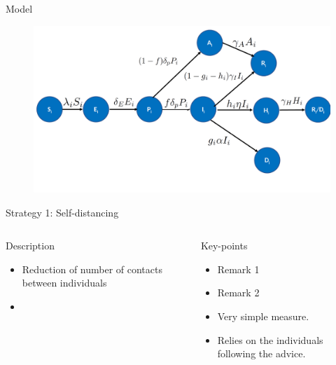 \documentclass[12pt,handout]{beamer}
\begin{document}
\begin{frame}{Model}
    \begin{figure}[ht]
        \includegraphics[width=.95\linewidth]{Model_graph_APG}
    \end{figure}
\end{frame}

\begin{frame}{Strategy 1: Self-distancing}

    \begin{columns}[t]
        \begin{column}{.5\textwidth}
        \begin{block}{Description}
        \begin{itemize}
            \item Reduction of number of contacts between individuals
            \item 
        \end{itemize}
        \end{block}
        \end{column}
        \begin{column}{.5\textwidth}
            \begin{block}{Key-points}
            \begin{itemize}
                \item Remark 1
                \item Remark 2
                \item Very simple measure.
                \item Relies on the individuals following the advice.
            \end{itemize}
            \end{block}
        \end{column}
    \end{columns}

\end{frame}
\end{document}
